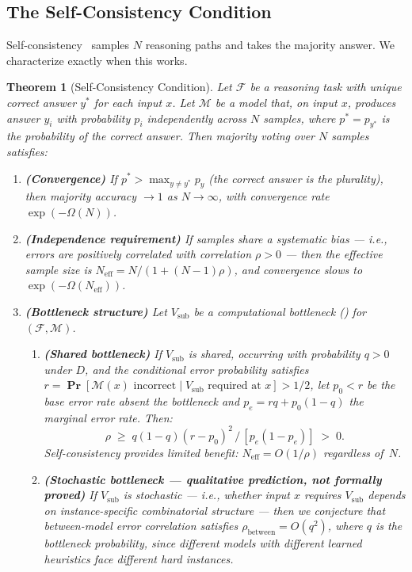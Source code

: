 \documentclass{article}
\newtheorem{theorem}{Theorem}
\theoremstyle{definition}
\theoremstyle{remark}
\newcommand{\calM}{\mathcal{M}}         %
\newcommand{\calF}{\mathcal{F}}         %
\renewcommand{\Pr}{\operatorname{\mathbf{Pr}}}
\begin{document}
\subsection{The Self-Consistency Condition}

Self-consistency~\citep{wang2023selfconsistency} samples $N$ reasoning paths and takes the majority answer.
We characterize exactly when this works.

\begin{theorem}[Self-Consistency Condition]
\label{thm:selfconsistency}
Let $\calF$ be a reasoning task with unique correct answer $y^*$ for each input $x$.
Let $\calM$ be a model that, on input $x$, produces answer $y_i$ with probability $p_i$ independently across $N$ samples, where $p^* = p_{y^*}$ is the probability of the correct answer.
Then majority voting over $N$ samples satisfies:
\begin{enumerate}[label=(\alph*)]
    \item \textbf{(Convergence)} If $p^* > \max_{y \neq y^*} p_y$ (the correct answer is the plurality), then majority accuracy $\to 1$ as $N \to \infty$, with convergence rate $\exp(-\Omega(N))$.
    \item \textbf{(Independence requirement)} If samples share a systematic bias --- i.e., errors are positively correlated with correlation $\rho > 0$ --- then the effective sample size is $N_{\text{eff}} = N / (1 + (N-1)\rho)$, and convergence slows to $\exp(-\Omega(N_{\text{eff}}))$.
    \item \textbf{(Bottleneck structure)} Let $V_{\mathrm{sub}}$ be a computational bottleneck () for $(\calF, \calM)$.
    \begin{enumerate}[label=(\roman*)]
        \item \textbf{(Shared bottleneck)} If $V_{\mathrm{sub}}$ is shared, occurring with probability $q > 0$ under $D$, and the conditional error probability satisfies $r = \Pr[\calM(x) \text{ incorrect} \mid V_{\mathrm{sub}} \text{ required at } x] > 1/2$, let $p_0 < r$ be the base error rate absent the bottleneck and $p_e = rq + p_0(1-q)$ the marginal error rate.
        Then:
        \[
        \rho \;\geq\; q(1-q)(r - p_0)^2 \,/\, [p_e(1-p_e)] \;>\; 0.
        \]
        Self-consistency provides limited benefit: $N_{\mathrm{eff}} = O(1/\rho)$ regardless of~$N$.
        \item \textbf{(Stochastic bottleneck --- qualitative prediction, not formally proved)} If $V_{\mathrm{sub}}$ is stochastic --- i.e., whether input $x$ requires $V_{\mathrm{sub}}$ depends on instance-specific combinatorial structure --- then we conjecture that \emph{between-model} error correlation satisfies $\rho_{\mathrm{between}} = O(q^2)$, where $q$ is the bottleneck probability, since different models with different learned heuristics face different hard instances.

\end{enumerate}
\end{enumerate}
\end{theorem}
\end{document}
